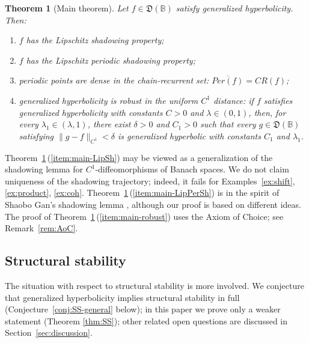 \documentclass[12pt]{article}
\newcommand{\Bb}{\mathbb{B}}
\newcommand{\DUC}{\mathfrak{D}}
\newtheorem{thm}{Theorem}
\theoremstyle{definition}
\newtheorem{remark}[thm]{Remark}
\begin{document}
\begin{thm}[Main theorem]\label{thm:main-results}
Let $f\in\DUC(\Bb)$ satisfy generalized hyperbolicity. Then:
\begin{enumerate}[
    label=\textup{(M\arabic*)},
    ref=\textup{M\arabic*}
]
    \item \label{item:main-LipSh}
    $f$ has the Lipschitz shadowing property;
    \item \label{item:main-LipPerSh}
    $f$ has the Lipschitz periodic shadowing property;
    \item \label{item:main-chain}
    periodic points are dense in the chain-recurrent set: $\overline{Per(f)}=CR(f)$;
    \item \label{item:main-robust}
    generalized hyperbolicity is robust in the uniform $C^1$
    distance: if $f$ satisfies generalized hyperbolicity with constants
    $C>0$ and $\lambda\in(0,1)$, then, for every
    $\lambda_1\in(\lambda,1)$, there exist $\delta>0$ and $C_1>0$ such
    that every $g\in\DUC(\Bb)$ satisfying
    $
    \|g-f\|_{C^1}<\delta
    $
    is generalized hyperbolic with constants $C_1$ and $\lambda_1$.
\end{enumerate}
\end{thm}

Theorem~\ref{thm:main-results}\,(\ref{item:main-LipSh}) may be viewed as a generalization of the
shadowing lemma for $C^1$-diffeomorphisms of Banach spaces.
We do not claim uniqueness of the shadowing trajectory; indeed, it fails
for Examples~\ref{ex:shift}, \ref{ex:product}, \ref{ex:coh}.
Theorem~\ref{thm:main-results}\,(\ref{item:main-LipPerSh}) is in the spirit of Shaobo Gan's
shadowing lemma \cite{Gan2002}, although our proof is based on different
ideas.
The proof of Theorem~\ref{thm:main-results}\,(\ref{item:main-robust}) uses the Axiom of Choice; see Remark~\ref{rem:AoC}.

\subsection{Structural stability}

The situation with respect to structural stability is more involved. We conjecture that generalized hyperbolicity implies structural stability in full (Conjecture~\ref{conj:SS-general} below); in this paper we prove only a weaker statement (Theorem \ref{thm:SS}); other related open questions are discussed in Section~\ref{sec:discussion}.
\end{document}
